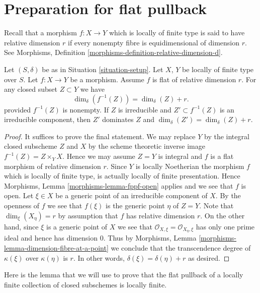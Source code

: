 \section{Preparation for flat pullback}
\label{section-preparation-flat-pullback}


\noindent
Recall that a morphism $f : X \to Y$ which is locally of finite type
is said to have relative dimension $r$ if every nonempty fibre
is equidimensional of dimension $r$. See
Morphisms, Definition \ref{morphisms-definition-relative-dimension-d}.

\begin{lemma}
\label{lemma-flat-inverse-image-dimension}
Let $(S, \delta)$ be as in Situation \ref{situation-setup}.
Let $X$, $Y$ be locally of finite type over $S$.
Let $f : X \to Y$ be a morphism.
Assume $f$ is flat of relative dimension $r$.
For any closed subset $Z \subset Y$ we have
$$
\dim_\delta(f^{-1}(Z)) = \dim_\delta(Z) + r.
$$
provided $f^{-1}(Z)$ is nonempty.
If $Z$ is irreducible and $Z' \subset f^{-1}(Z)$ is an irreducible
component, then $Z'$ dominates $Z$ and
$\dim_\delta(Z') = \dim_\delta(Z) + r$.
\end{lemma}

\begin{proof}
It suffices to prove the final statement.
We may replace $Y$ by the integral closed subscheme $Z$ and
$X$ by the scheme theoretic inverse image $f^{-1}(Z) = Z \times_Y X$.
Hence we may assume $Z = Y$ is integral and $f$ is a flat morphism
of relative dimension $r$. Since $Y$ is locally Noetherian the
morphism $f$ which is locally of finite type,
is actually locally of finite presentation. Hence
Morphisms, Lemma \ref{morphisms-lemma-fppf-open}
applies and we see that $f$ is open.
Let $\xi \in X$ be a generic point of an irreducible component
of $X$. By the openness of $f$ we see that $f(\xi)$ is the
generic point $\eta$ of $Z = Y$. Note that $\dim_\xi(X_\eta) = r$
by assumption that $f$ has relative dimension $r$. On the other
hand, since $\xi$ is a generic point of $X$ we see that
$\mathcal{O}_{X, \xi} = \mathcal{O}_{X_\eta, \xi}$ has only one
prime ideal and hence has dimension $0$. Thus by
Morphisms, Lemma \ref{morphisms-lemma-dimension-fibre-at-a-point}
we conclude that the transcendence
degree of $\kappa(\xi)$ over $\kappa(\eta)$ is $r$.
In other words, $\delta(\xi) = \delta(\eta) + r$ as desired.
\end{proof}

\noindent
Here is the lemma that we will use to prove that the flat pullback
of a locally finite collection of closed subschemes is locally finite.

